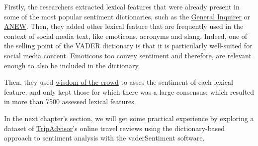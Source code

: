 	Firstly, the researchers extracted lexical features that were already present in some of the most popular sentiment dictionaries, such as the \href{https://wjh.harvard.edu/~inquirer/}{General Inquirer} or \href{https://csea.phhp.ufl.edu/media.html#bottommedia}{ANEW}. Then, they added other lexical feature that are frequently used in the context of social media text, like emoticons, acronyms and slang. Indeed, one of the selling point of the VADER dictionary is that it is particularly well-suited for social media content. Emoticons too convey sentiment and therefore, are relevant enough to also be included in the dictionary.
	
	Then, they used \href{https://en.wikipedia.org/wiki/Wisdom_of_the_crowd}{wisdom-of-the-crowd} to asses the sentiment of each lexical feature, and only kept those for which there was a large consensus; which resulted in more than 7500 assessed lexical features.
	
	In the next chapter's section, we will get some practical experience by exploring a dataset of \href{https://www.tripadvisor.com/}{TripAdvisor}'s online travel reviews using the dictionary-based approach to sentiment analysis with the vaderSentiment software.

